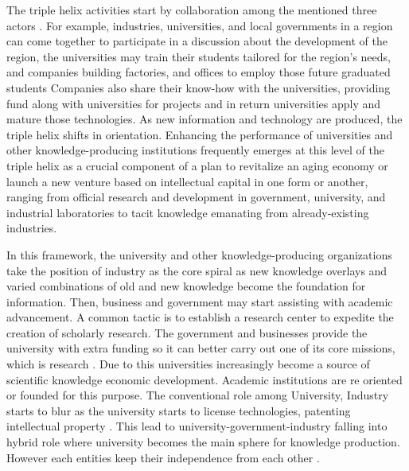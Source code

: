 \documentclass[CHICAGO,Times1COL]{WileyNJDv5} %
\begin{document}
The triple helix activities start by collaboration among the mentioned three actors \citet{TheTripleHelixModelandtheFutureofInnovationAReflectionontheTripleHelixResearchAgenda}. For example, industries, universities, and local governments in a region can come together to participate in a discussion about the development of the region, the universities may train their students tailored for the region's needs, and companies building factories, and offices to employ those future graduated students Companies also share their know-how with the universities, providing fund along with universities for projects and in return universities apply and mature those technologies. As new information and technology are produced, the triple helix shifts in orientation. Enhancing the performance of universities and other knowledge-producing institutions frequently emerges at this level of the triple helix as a crucial component of a plan to revitalize an aging economy or launch a new venture based on intellectual capital in one form or another, ranging from official research and development in government, university, and industrial laboratories to tacit knowledge emanating from already-existing industries. 

In this framework, the university and other knowledge-producing organizations take the position of industry as the core spiral as new knowledge overlays and varied combinations of old and new knowledge become the foundation for information. Then, business and government may start assisting with academic advancement. A common tactic is to establish a research center to expedite the creation of scholarly research. The government and businesses provide the university with extra funding so it can better carry out one of its core missions, which is research \citep{etzkowitz2008triple}. Due to this universities increasingly become a source of scientific knowledge economic development. Academic institutions are re oriented or founded for this purpose. The conventional role among University, Industry starts to blur as the university starts to license technologies, patenting intellectual property \citet{doi:10.1080/08109028.2014.972135}. This lead to university-government-industry falling into hybrid role where university becomes the main sphere for knowledge production. However each entities keep their independence from each other \citet{doi:10.1177/05390184030423002}. 
\end{document}
